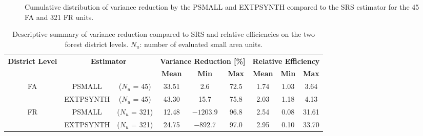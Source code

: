 \documentclass[remotesensing,article,accept,moreauthors,pdftex,10pt,a4paper]{Definitions/mdpi}
\begin{document}
\begin{figure}[H]
	\centering
	\caption{Cumulative distribution of variance reduction by the PSMALL and EXTPSYNTH compared to the SRS estimator for the 45 FA and 321 FR units.}
	\label{fig:gain}
\end{figure}
\vspace{-12pt}
\begin{table}[H]
	\begin{center}
		\caption{Descriptive summary of variance reduction compared to SRS and relative efficiencies on the two forest district levels. $N_u$: number of evaluated small area units.}
		\label{tab:gain}
		{\small %
			\begin{tabular}{ccccccccc} %
				\toprule
				\multirow{2}{*}{\vspace{-3PT}\textbf{District Level}} & \multicolumn{2}{c}{\multirow{2}{*}{\vspace{-3PT}\textbf{Estimator}}} & \multicolumn{3}{c}{\textbf{Variance Reduction [\%]}} & \multicolumn{3}{c}{\textbf{Relative Efficiency}} \\
				\cmidrule{4-9} & & & \textbf{Mean} & \textbf{Min} & \textbf{Max} & \textbf{Mean} & \textbf{Min} & \textbf{Max} \\
				\midrule
				\multirow{2}{*}{FA} & PSMALL    & ($N_u$ = 45)  & 33.51 &  2.6 & 72.5 & 1.74 & 1.03 & 3.64 \\
				& EXTPSYNTH & ($N_u$ = 45)  & 43.30 & 15.7 & 75.8 & 2.03  & 1.18 & 4.13 \\
			\midrule
				\multirow{2}{*}{FR} & PSMALL    & ($N_u$ = 321) & 12.48 & $-1203.9$ & 96.8 & 2.54 & 0.08 & 31.61  \\
				& EXTPSYNTH & ($N_u$ = 321) & 24.75 & $-892.7$  & 97.0 & 2.95 & 0.10 & 33.70 \\
				\bottomrule
			\end{tabular}
		}%
	\end{center}
\end{table}
\end{document}
